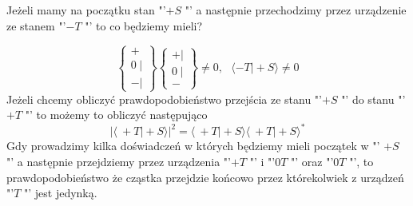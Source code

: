 Jeżeli mamy na początku stan "'$+S$ "'  a następnie przechodzimy przez urządzenie ze stanem "'$-T$ "' to co będziemy mieli? 


\begin{equation*}
	\left\{\begin{array}{lr}
		+ \\
		0 \hspace{3pt} \vert \\
		- \vert
	\end{array}\right\} 
	\left\{\begin{array}{lr}
		+ \vert \\
		0 \hspace{3pt} \vert \\
		- 
	\end{array}\right\}
	\neq 0 \text{,} \hspace{10pt}  \langle-T \vert +S\rangle \neq 0
\end{equation*}
Jeżeli chcemy obliczyć prawdopodobieństwo przejścia ze stanu "'$+S$ "' do stanu "'$+T$ "' to możemy to obliczyć następująco
\begin{equation*}
	\left| \langle\ +T\vert+S \rangle \right|^2 = \langle\ +T\vert+S \rangle \langle\ +T\vert+S \rangle^*
\end{equation*}
Gdy prowadzimy kilka doświadczeń w których będziemy mieli początek w "' $+S$ "' a następnie przejdziemy przez urządzenia "'$+T$ "' i  "'$0T$ "' oraz "'$0T$ "', to prawdopodobieństwo że cząstka przejdzie końcowo przez którekolwiek z urządzeń "'$T$ "' jest jedynką.

